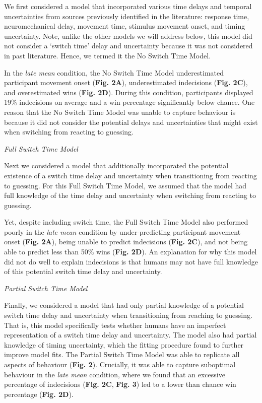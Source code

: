 \documentclass[man,donotrepeattitle,floatsintext,letterpaper,12pt]{apa7}
\newcommand\boldblue[1]{\textcolor{mydarkblue}{\textbf{#1}}}
\begin{document}
\noindent We first considered a model that incorporated various time delays and temporal uncertainties from sources previously identified in the literature: response time, neuromechanical delay, movement time, stimulus movement onset, and timing uncertainty. Note, unlike the other models we will address below, this model did not consider a `switch time’ delay and uncertainty because it was not considered in past literature. Hence, we termed it the No Switch Time Model.

In the \emph{late mean} condition, the No Switch Time Model underestimated participant movement onset (\boldblue{Fig. 2A}), underestimated indecisions (\boldblue{Fig. 2C}), and overestimated wins (\boldblue{Fig. 2D}). During this condition, participants displayed 19\% indecisions on average and a win percentage significantly below chance. One reason that the No Switch Time Model was unable to capture behaviour is because it did not consider the potential delays and uncertainties that might exist when switching from reacting to guessing.

\vspace*{2mm}
\noindent\emph{{{Full Switch Time Model}}}

\noindent Next we considered a model that additionally incorporated the potential existence of a switch time delay and uncertainty when transitioning from reacting to guessing. For this Full Switch Time Model, we assumed that the model had full knowledge of the time delay and uncertainty when switching from reacting to guessing.

Yet, despite including switch time, the Full Switch Time Model also performed poorly in the \emph{late mean} condition by under-predicting participant movement onset (\boldblue{Fig. 2A}), being unable to predict indecisions (\boldblue{Fig. 2C}), and not being able to predict less than 50\% wins (\boldblue{Fig. 2D}). An explanation for why this model did not do well to explain indecisions is that humans may not have full knowledge of this potential switch time delay and uncertainty.

\vspace*{2mm}
\noindent\emph{{{Partial Switch Time Model}}}

\noindent Finally, we considered a model that had only partial knowledge of a potential switch time delay and uncertainty when transitioning from reaching to guessing. That is, this model specifically tests whether humans have an imperfect representation of a switch time delay and uncertainty. The model also had partial knowledge of timing uncertainty, which the fitting procedure found to further improve model fits. The Partial Switch Time Model was able to replicate all aspects of behaviour (\boldblue{Fig. 2}). Crucially, it was able to capture suboptimal behaviour in the \emph{late mean} condition, where we found that an excessive percentage of indecisions (\boldblue{Fig. 2C}, \boldblue{Fig. 3}) led to a lower than chance win percentage (\boldblue{Fig. 2D}).
\end{document}
